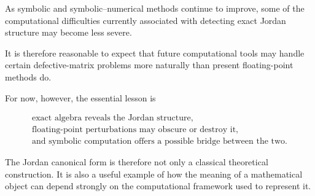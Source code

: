 \documentclass[11pt]{article}
\begin{document}
As symbolic and symbolic--numerical methods continue to improve, some
of the computational difficulties currently associated with detecting
exact Jordan structure may become less severe.

It is therefore reasonable to expect that future computational tools
may handle certain defective-matrix problems more naturally than
present floating-point methods do.

For now, however, the essential lesson is

\[
\boxed{
\begin{array}{c}
\text{exact algebra reveals the Jordan structure,}\\[1mm]
\text{floating-point perturbations may obscure or destroy it,}\\[1mm]
\text{and symbolic computation offers a possible bridge between the two.}
\end{array}
}
\]

The Jordan canonical form is therefore not only a classical theoretical
construction.  It is also a useful example of how the meaning of a
mathematical object can depend strongly on the computational framework
used to represent it.
\end{document}
